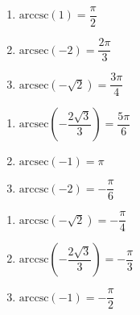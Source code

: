 \begin{multicols}{3} 

\begin{enumerate}

\setcounter{enumi}{\value{HW}}

\item $\mbox{arccsc} \left( 1 \right) = \dfrac{\pi}{2}$ 
\item $\mbox{arcsec} \left( -2 \right) = \dfrac{2\pi}{3}$ 
\item $\mbox{arcsec} \left( -\sqrt{2} \right) = \dfrac{3\pi}{4}$ 


\setcounter{HW}{\value{enumi}}

\end{enumerate}

\end{multicols}

\begin{multicols}{3} 

\begin{enumerate}

\setcounter{enumi}{\value{HW}}


\item $\mbox{arcsec} \left( -\dfrac{2\sqrt{3}}{3} \right) = \dfrac{5\pi}{6}$
\item $\mbox{arcsec} \left( -1 \right) = \pi$ 
\item $\mbox{arccsc} \left( -2 \right) = -\dfrac{\pi}{6}$ 

\setcounter{HW}{\value{enumi}}

\end{enumerate}

\end{multicols}

\begin{multicols}{3} 

\begin{enumerate}

\setcounter{enumi}{\value{HW}}


\item $\mbox{arccsc} \left( -\sqrt{2} \right) = -\dfrac{\pi}{4}$ 
\item $\mbox{arccsc} \left( -\dfrac{2\sqrt{3}}{3} \right) = -\dfrac{\pi}{3}$
\item $\mbox{arccsc} \left( -1 \right) = -\dfrac{\pi}{2}$ 

\setcounter{HW}{\value{enumi}}

\end{enumerate}

\end{multicols}

